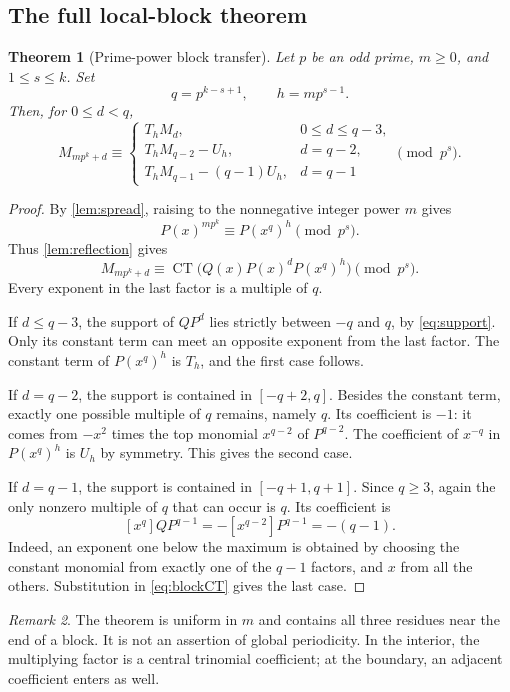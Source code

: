 \documentclass[11pt,a4paper]{article}
\numberwithin{equation}{section}
\newtheorem{theorem}{Theorem}[section]
\theoremstyle{definition}
\theoremstyle{remark}
\newtheorem{remark}[theorem]{Remark}
\DeclareMathOperator{\CT}{CT}
\begin{document}
\subsection{The full local-block theorem}
\begin{theorem}[Prime-power block transfer]\label{thm:block}
Let $p$ be an odd prime, $m\geq0$, and $1\leq s\leq k$. Set
\[
 q=p^{k-s+1},\qquad h=mp^{s-1}.
\]
Then, for $0\leq d<q$,
\begin{equation}\label{eq:block}
 M_{mp^k+d}\equiv
 \begin{cases}
 T_hM_d,&0\leq d\leq q-3,\\
 T_hM_{q-2}-U_h,&d=q-2,\\
 T_hM_{q-1}-(q-1)U_h,&d=q-1
 \end{cases}
 \pmod{p^s}.
\end{equation}
\end{theorem}
\begin{proof}
By \cref{lem:spread}, raising to the nonnegative integer power $m$ gives
\[
 P(x)^{mp^k}\equiv P(x^q)^h\pmod{p^s}.
\]
Thus \cref{lem:reflection} gives
\begin{equation}\label{eq:blockCT}
 M_{mp^k+d}\equiv\CT\bigl(Q(x)P(x)^dP(x^q)^h\bigr)\pmod{p^s}.
\end{equation}
Every exponent in the last factor is a multiple of $q$.

If $d\leq q-3$, the support of $QP^d$ lies strictly between $-q$ and
$q$, by \eqref{eq:support}. Only its constant term can meet an opposite
exponent from the last factor. The constant term of $P(x^q)^h$ is
$T_h$, and the first case follows.

If $d=q-2$, the support is contained in $[-q+2,q]$. Besides the constant
term, exactly one possible multiple of $q$ remains, namely $q$. Its
coefficient is $-1$: it comes from $-x^2$ times the top monomial
$x^{q-2}$ of $P^{q-2}$. The coefficient of $x^{-q}$ in $P(x^q)^h$ is
$U_h$ by symmetry. This gives the second case.

If $d=q-1$, the support is contained in $[-q+1,q+1]$. Since $q\geq3$,
again the only nonzero multiple of $q$ that can occur is $q$. Its
coefficient is
\[
 [x^q]QP^{q-1}=-[x^{q-2}]P^{q-1}=-(q-1).
\]
Indeed, an exponent one below the maximum is obtained by choosing the
constant monomial from exactly one of the $q-1$ factors, and $x$ from
all the others. Substitution in \eqref{eq:blockCT} gives the last case.
\end{proof}

\begin{remark}
The theorem is uniform in $m$ and contains all three residues near the
end of a block. It is not an assertion of global periodicity. In the
interior, the multiplying factor is a central trinomial coefficient; at
the boundary, an adjacent coefficient enters as well.
\end{remark}
\end{document}
